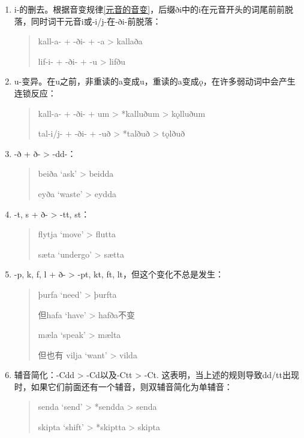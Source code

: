 \begin{enumerate}
    \item
          i-的删去。根据音变规律\ref{元音的音变}，后缀ði中的i在元音开头的词尾前前脱落，同时词干元音i或-i/j-在-ði-前脱落：

          \begin{quote}
              kall-a- + -ði- + -a > kallaða

              lif-i- + -ði- + -u > lifðu
          \end{quote}
    \item
          u-变异。在u之前，非重读的a变成u，重读的a变成ǫ，在许多弱动词中会产生连锁反应：

          \begin{quote}
              kall-a- + -ði- + um > *kalluðum > kǫlluðum

              tal-i/j- + -ði- + -uð > *talðuð > tǫlðuð
          \end{quote}

    \item
          -ð + ð- > -dd-：

          \begin{quote}
              beiða `ask' > beidda

              eyða `waste' > eydda
          \end{quote}

    \item
          -t, s + ð- > -tt, st：

          \begin{quote}
              flytja `move‌' > flutta

              sæta `undergo‌' > sætta
          \end{quote}

    \item
          -p, k, f, l + ð- > -pt, kt, ft,
          lt，但这个变化不总是发生：

          \begin{quote}
              þurfa `need‌' > þurfta

              但hafa `have‌' > hafða不变

              mæla `speak‌' > mælta

              但也有 vilja `want‌' > vilda
          \end{quote}

    \item
          辅音简化：-Cdd > -Cd以及-Ctt > -Ct. 这表明，当上述的规则导致dd/tt出现时，如果它们前面还有一个辅音，则双辅音简化为单辅音：

          \begin{quote}
              senda `send‌' > *sendda > senda

              skipta `shift‌' > *skiptta > skipta
          \end{quote}
\end{enumerate}

